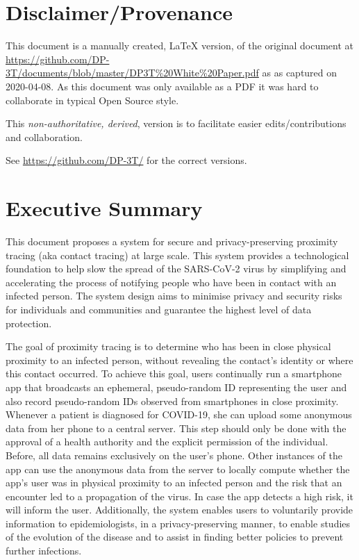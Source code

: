 \documentclass[10.8pt,a4paper]{article}
\begin{document}
\pagebreak

\section*{Disclaimer/Provenance}

This document is a manually created, LaTeX version, of the original document at \url{https://github.com/DP-3T/documents/blob/master/DP3T\%20White\%20Paper.pdf} as 
as captured on 2020-04-08. As this document was only available as a PDF it was hard to collaborate in typical Open Source style.

This\emph{ non-authoritative, derived}, version is to facilitate easier edits/contributions and collaboration.

See \url{https://github.com/DP-3T/} for the correct versions.

\pagebreak

\section*{Executive Summary}

This document proposes a system for secure and privacy-preserving proximity tracing  (aka contact tracing)  at large scale. This system provides a technological foundation to help slow the spread of the SARS-CoV-2 virus by simplifying and accelerating the process of notifying people who have been in contact with an infected person. The system design aims to minimise privacy and security risks for individuals and communities and guarantee the highest level of data protection.

The goal of proximity tracing is to determine who has been in close physical proximity to an infected person, without revealing the contact’s identity or where this contact occurred. To achieve this goal, users continually run a smartphone app that broadcasts an ephemeral, pseudo-random ID representing the user and also record pseudo-random IDs observed from smartphones in close proximity. Whenever a patient is diagnosed for COVID-19, she can upload some anonymous data from her phone to a central server. This step should only be done with the approval of a health authority and the explicit permission of the individual. Before, all data remains exclusively on the user’s phone. Other instances of the app can use the anonymous data from the server to locally compute whether the app’s user was in physical proximity to an infected person and the risk that an encounter led to a propagation of the virus. In case the app detects a high risk, it will inform the user. Additionally, the system enables users to voluntarily provide information to epidemiologists, in a privacy-preserving manner, to enable studies of the evolution of the disease and to assist in finding better policies to prevent further infections.
\end{document}
